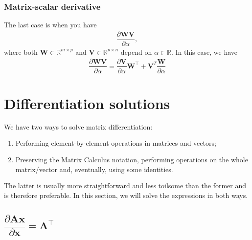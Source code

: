 \documentclass{article}
\newcommand{\trans}{\top}
\begin{document}
\subsubsection{Matrix-scalar derivative}
The last case is when you have
\begin{align}
    \dfrac{\partial \mathbf{W}\mathbf{V}}{\partial \alpha},
\end{align}
where both \(\mathbf{W} \in \mathbb{R}^{m \times p}\) and \(\mathbf{V} \in \mathbb{R}^{p\times n}\) depend on \(\alpha \in \mathbb{R}\). In this case, we have
\begin{align}
    \label{eq:matrix-matrix-product-rule}
    \dfrac{\partial \mathbf{W}\mathbf{V}}{\partial \alpha} = \dfrac{\partial \mathbf{V}}{\partial \alpha}\mathbf{W}^{\trans} + \mathbf{V}^{T} \dfrac{\mathbf{W}}{\partial \alpha}
\end{align}


\section{Differentiation solutions}\label{sec:diff}
We have two ways to solve matrix differentiation:
\begin{enumerate}
    \item Performing element-by-element operations in matrices and vectors;
    \item Preserving the Matrix Calculus notation, performing operations on the whole matrix/vector and, eventually, using some identities.
\end{enumerate}
The latter is usually more straightforward and less toilsome than the former and is therefore preferable. In this section, we will solve the expressions in both ways.

\subsection{\(\dfrac{\partial \mathbf{A} \mathbf{x}}{\partial \mathbf{x}} = \mathbf{A}^\trans\)}
\end{document}

